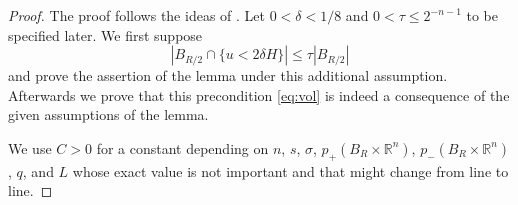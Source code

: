 \documentclass[11pt]{amsart}
\theoremstyle{plain}
\theoremstyle{definition}
\numberwithin{equation}{section}
\begin{document}
\begin{proof}
The proof follows the ideas of \cite[Proof of Lemma 6.3]{Coz17}. 
Let $0<\delta<1/8$ and $0<\tau\leq 2^{-n-1}$ to be specified later. We first suppose 
\begin{equation}\label{eq:vol}
|B_{R/2} \cap \lbrace u < 2\delta H \rbrace| \leq \tau |B_{R/2}|
\end{equation}
and prove the assertion of the lemma under this additional assumption. Afterwards we prove that this precondition \eqref{eq:vol} is indeed a consequence of the given assumptions of the lemma.

We use $C>0$ for a constant depending on $n$, $s$, $\sigma$, $p_+(B_R \times \mathbb{R}^n)$, $p_-(B_R \times \mathbb{R}^n)$, $q$, and $L$ whose exact value is not important and that might change from line to line.


\end{proof}
\end{document}
